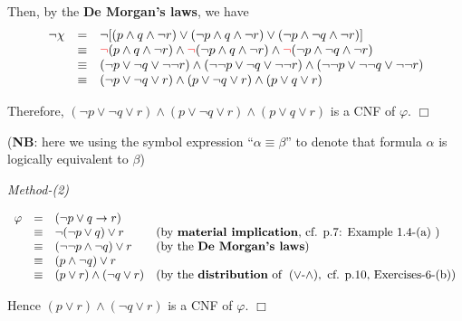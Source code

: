 \documentclass[UTF8,12pt,a4paper]{ctexart}
\begin{document}
Then, by the \textbf{De Morgan’s laws}, we have
\[\begin{array}{l l l}
	\neg \chi 
	&=&   
	\neg [ (p \land q \land \neg r) \lor (\neg p \land q \land \neg r) \lor (\neg p \land  \neg q \land \neg r)  ] \\
	
	&\equiv&   
	{\color{red} \neg} (p \land q \land \neg r) \land {\color{red} \neg} (\neg p \land q \land \neg r) \land {\color{red} \neg} (\neg p \land  \neg q \land \neg r)  \\
	
	&\equiv&   
	( \neg p \lor \neg q \lor  \neg \neg r) \land  ( \neg \neg p \lor \neg q \lor \neg \neg r) \land  (\neg \neg p \lor \neg  \neg q \lor \neg \neg r)  \\
	
	&\equiv&   
	( \neg p \lor \neg q \lor  r) \land  ( p \lor \neg q \lor r) \land  ( p \lor  q \lor r)  \\
\end{array}\]

Therefore, $ ( \neg p \lor \neg q \lor  r) \land  ( p \lor \neg q \lor r) \land  ( p \lor  q \lor r) $ is a CNF of $\varphi$.
\hfill $\Box$

(\textbf{NB}: here we using the symbol expression “$\alpha \equiv \beta$” \; to denote that formula $\alpha$ is logically equivalent to $\beta$)



\vspace{1em}
\noindent\textit{Method-(2)}

\[\begin{array}{l l l l}
	\varphi 
	&=& 
	(\neg p \lor q \to r) \\
	
	&\equiv&
	\neg ( \neg p \lor q) \lor r  & \text{(by \textbf{material implication},}   \text{ cf. p.7: Example 1.4-(a) )}\\
	
	&\equiv&
	(\neg \neg p \land \neg q) \lor r & \text{(by the \textbf{De Morgan’s laws})}  \\
	
	&\equiv&
	( p \land \neg q) \lor r   \\
	
	&\equiv&
	(p \lor r) \land (\neg q \lor r) & (\text{by the \textbf{distribution} of \;} (\lor\text{-}\land), 
	\text{ cf. p.10, Exercises-6-(b)} )\\ 
\end{array}\]

Hence $(p \lor r) \land (\neg q \lor r)$ is a CNF of $\varphi$.
\hfill $\Box$
\end{document}

